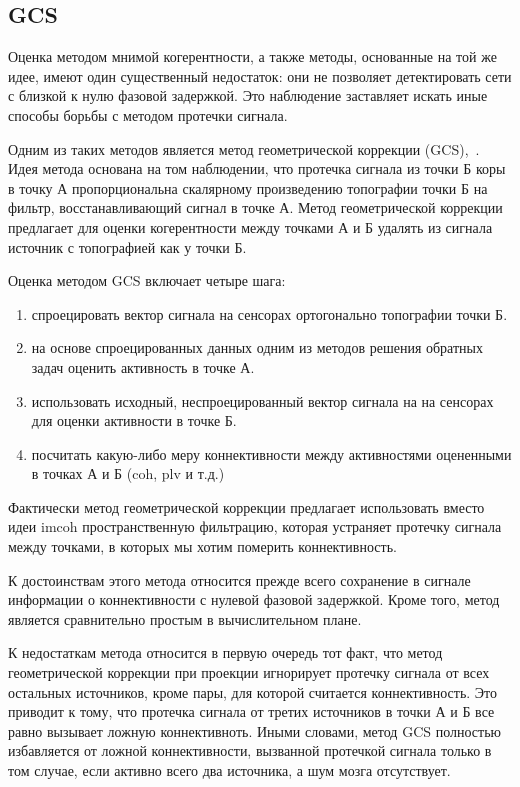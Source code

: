 \subsection{GCS}
Оценка методом мнимой когерентности, а также методы, основанные на 
той же идее, имеют один существенный недостаток: они не позволяет
детектировать сети с близкой к нулю фазовой задержкой. Это наблюдение
заставляет искать иные способы борьбы с методом протечки сигнала.

Одним из таких методов является метод геометрической коррекции
(GCS),~\cite{GCS}.  Идея метода основана на том наблюдении, что протечка
сигнала из точки Б коры в точку А пропорциональна скалярному произведению
топографии точки Б на фильтр, восстанавливающий сигнал в точке А. Метод
геометрической коррекции предлагает для оценки когерентности между точками А и
Б удалять из сигнала источник с топографией как у точки Б.

Оценка методом GCS включает четыре шага:

\begin{enumerate}
    \item спроецировать вектор сигнала на сенсорах ортогонально
        топографии точки Б.
    \item на основе спроецированных данных одним из методов решения
        обратных задач оценить активность в точке А.
    \item использовать исходный, неспроецированный вектор сигнала на на сенсорах
        для оценки активности в точке Б.
    \item посчитать какую-либо меру коннективности между активностями
        оцененными в точках А и Б (coh, plv и т.д.)
\end{enumerate}

Фактически метод геометрической коррекции предлагает использовать вместо идеи
imcoh пространственную фильтрацию, которая устраняет протечку сигнала между
точками, в которых мы хотим померить коннективность.

К достоинствам этого метода относится прежде всего сохранение в сигнале
информации о коннективности с нулевой фазовой задержкой. Кроме того, метод
является сравнительно простым в вычислительном плане.

К недостаткам метода относится в первую очередь тот факт, что метод
геометрической коррекции при проекции игнорирует протечку сигнала от всех
остальных источников, кроме пары, для которой считается коннективность. Это
приводит к тому, что протечка сигнала от третих источников в точки А и Б все
равно вызывает ложную коннективноть.  Иными словами, метод GCS полностью
избавляется от ложной коннективности, вызванной протечкой сигнала только в том
случае, если активно всего два источника, а шум мозга отсутствует.

